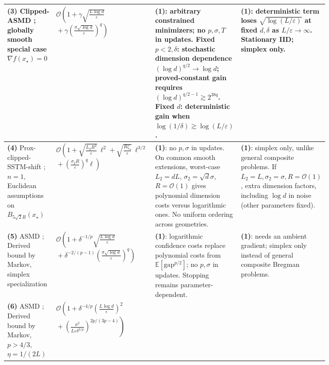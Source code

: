 \begin{table}[tp]
\begin{threeparttable}
\begin{tabularx}{\linewidth}{@{}>{\raggedright\arraybackslash}p{0.18\linewidth}>{\raggedright\arraybackslash}p{0.32\linewidth}>{\raggedright\arraybackslash}p{0.27\linewidth}>{\raggedright\arraybackslash}X@{}}
\midrule
\textbf{(3)} Clipped-ASMD \citep[Thm.~4.1]{nguyen2023heavyv2}; globally smooth special case $\nabla f(x_\star)=0$ & $\displaystyle\mathcal{O}\!\left(1+\gamma\sqrt{\frac{L\log d}{\varepsilon}}\right.$\newline $\displaystyle\left.{}+\gamma\left(\frac{\sigma\sqrt{\log d}}{\varepsilon}\right)^q\right)$ & \textbf{(1)}: arbitrary constrained minimizers; no $p,\sigma,T$ in updates. Fixed $p<2,\delta$: stochastic dimension dependence $(\log d)^{q/2}\to\log d$; proved-constant gain requires $(\log d)^{q/2-1}\gtrsim2^{38q}$. Fixed $d$: deterministic gain when $\log(1/\delta)\gtrsim\log(L/\varepsilon)$. & \textbf{(1)}: deterministic term loses $\sqrt{\log(L/\varepsilon)}$ at fixed $d,\delta$ as $L/\varepsilon\to\infty$. Stationary IID; simplex only. \\
\midrule
\textbf{(4)} Prox-clipped-SSTM-shift \citep[Thm.~2.7]{gorbunov2024heavy}; $n=1$, Euclidean assumptions on $B_{5\sqrt2R}(x_\star)$ & $\displaystyle\mathcal{O}\!\left(1+\sqrt{\frac{L_2R^2}{\varepsilon}}\,\ell^2+\sqrt{\frac{R\zeta_\star}{\varepsilon}}\,\ell^{3/2}\right.$\newline $\displaystyle\left.{}+\left(\frac{\sigma_2R}{\varepsilon}\right)^q\ell\right)$ & \textbf{(1)}: no $p,\sigma$ in updates. On common smooth extensions, worst-case $L_2=dL$, $\sigma_2=\sqrt d\sigma$, $R=\mathcal{O}(1)$ gives polynomial dimension costs versus logarithmic ones. No uniform ordering across geometries. & \textbf{(1)}: simplex only, unlike general composite problems. If $L_2=L,\sigma_2=\sigma,R=\mathcal{O}(1)$, extra dimension factors, including $\log d$ in noise (other parameters fixed). \\
\midrule
\textbf{(5)} ASMD \citep[Thm.~3.3, horizon-tuned bound]{liu2026expectationv1}; Derived bound by Markov, simplex specialization & $\displaystyle\mathcal{O}\!\left(1+\delta^{-1/p}\sqrt{\frac{L\log d}{\varepsilon}}\right.$\newline $\displaystyle\left.{}+\delta^{-2/(p-1)}\left(\frac{\sigma\sqrt{\log d}}{\varepsilon}\right)^q\right)$ & \textbf{(1)}: logarithmic confidence costs replace polynomial costs from $\mathbb E[\mathrm{gap}^{p/2}]$; no $p,\sigma$ in updates. Stopping remains parameter-dependent. & \textbf{(1)}: needs an ambient gradient; simplex only instead of general composite Bregman problems. \\
\midrule
\textbf{(6)} ASMD \citep[Thm.~3.3, unknown-$p$ bound]{liu2026expectationv1}; Derived bound by Markov, $p>4/3$, $\eta=1/(2L)$
& $\displaystyle\mathcal{O}\!\left(1+\delta^{-4/p}\left(\frac{L\log d}{\varepsilon}\right)^2\right.$\newline $\displaystyle\left.{}+\left(\frac{\sigma^2}{L\varepsilon\delta^{2/p}}\right)^{2p/(3p-4)}\right)$

\end{tabularx}
\end{threeparttable}
\end{table}
